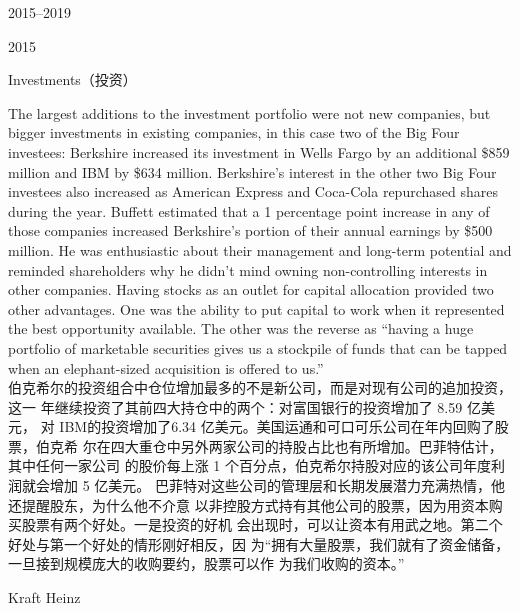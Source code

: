 \begin{chapter}{2015--2019}
\begin{section}{2015}
\begin{subsection}{Investments（投资）}
\begin{verseparallel}
  {
    The largest additions to the investment portfolio were not new companies,
    but bigger investments in existing companies, in this case two of the Big
    Four investees: Berkshire increased its investment in Wells Fargo by an
    additional \$859 million and IBM by \$634 million. Berkshire's interest in
    the other two Big Four investees also increased as American Express and
    Coca-Cola repurchased shares during the year. Buffett estimated that a 1
    percentage point increase in any of those companies increased Berkshire's
    portion of their annual earnings by \$500 million. He was enthusiastic about
    their management and long-term potential and reminded shareholders why he
    didn't mind owning non-controlling interests in other companies. Having
    stocks as an outlet for capital allocation provided two other advantages.
    One was the ability to put capital to work when it represented the best
    opportunity available. The other was the reverse as ``having a huge
    portfolio of marketable securities gives us a stockpile of funds that can be
    tapped when an elephant-sized acquisition is offered to us.'' \\
  }
  {
    伯克希尔的投资组合中仓位增加最多的不是新公司，而是对现有公司的追加投资，这一
    年继续投资了其前四大持仓中的两个：对富国银行的投资增加了 8.59 亿美元，
    对 IBM的投资增加了6.34 亿美元。美国运通和可口可乐公司在年内回购了股票，伯克希
    尔在四大重仓中另外两家公司的持股占比也有所增加。巴菲特估计，其中任何一家公司
    的股价每上涨 1 个百分点，伯克希尔持股对应的该公司年度利润就会增加 5 亿美元。
    巴菲特对这些公司的管理层和长期发展潜力充满热情，他还提醒股东，为什么他不介意
    以非控股方式持有其他公司的股票，因为用资本购买股票有两个好处。一是投资的好机
    会出现时，可以让资本有用武之地。第二个好处与第一个好处的情形刚好相反，因
    为“拥有大量股票，我们就有了资金储备，一旦接到规模庞大的收购要约，股票可以作
    为我们收购的资本。”
  }
\end{verseparallel}
\end{subsection}

\begin{subsection}{Kraft Heinz}


\end{subsection}
\end{section}
\end{chapter}
